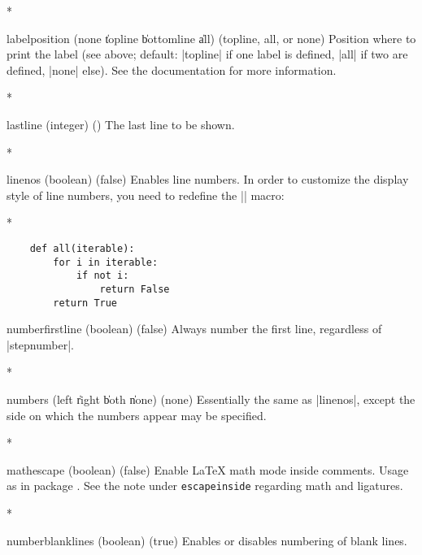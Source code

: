 \begin{paracol}{2}
\begin{optionlist}
\switchcolumn[0]*%
  \item[labelposition (none \| topline \| bottomline \| all) (topline, all,  \textrm{or} none)]
    Position where to print the label (see above;  default: |topline| if one label is defined, |all| if two are defined, |none| else).
    See the  documentation for more information.
    \switchcolumn

\switchcolumn[0]*%
  \item[lastline (integer) (\meta{last line of input})]
    The last line to be shown.
    \switchcolumn

\switchcolumn[0]*%
  \item[linenos (boolean) (false)]
    Enables line numbers.
    In order to customize the display style of line numbers, you need to redefine the |\theFancyVerbLine| macro:
    \switchcolumn

    \switchcolumn[0]*%
\begin{example}
    \renewcommand{\theFancyVerbLine}{\sffamily
        \textcolor[rgb]{0.5,0.5,1.0}{\scriptsize
        \oldstylenums{\arabic{FancyVerbLine}}}}

    \begin{verbatim}
    def all(iterable):
        for i in iterable:
            if not i: 
                return False
        return True
    \end{verbatim}
\end{example}

\item[numberfirstline (boolean) (false)]
Always number the first line, regardless of |stepnumber|.
\switchcolumn

\switchcolumn[0]*%

  \item[numbers (left \| right \| both \| none) (none)]
    Essentially the same as |linenos|, except the side on which the numbers appear may be specified.
    \switchcolumn

\switchcolumn[0]*%
  \item[mathescape (boolean) (false)]
    Enable \LaTeX{} math mode inside comments.
    Usage as in package .
    See the note under \texttt{escapeinside} regarding math and ligatures.
    \switchcolumn

\switchcolumn[0]*%
  \item[numberblanklines (boolean) (true)]
    Enables or disables numbering of blank lines.
    \switchcolumn


\end{optionlist}
\end{paracol}
